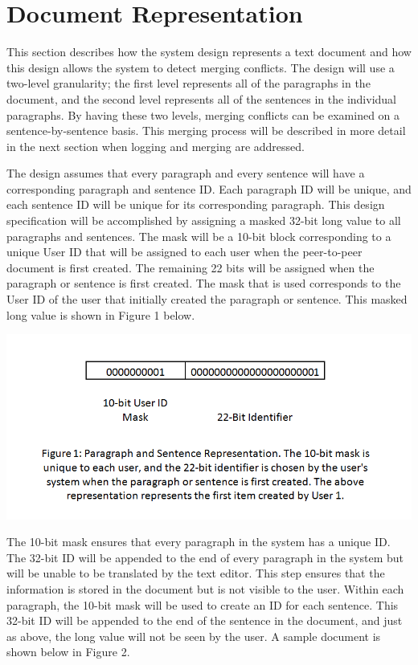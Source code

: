 \section{Document Representation}
This section describes how the system design represents a text document and how this design allows the system to detect merging conflicts. The design will use a two-level granularity; the first level represents all of the paragraphs in the document, and the second level represents all of the sentences in the individual paragraphs. By having these two levels, merging conflicts can be examined on a sentence-by-sentence basis. This merging process will be described in more detail in the next section when logging and merging are addressed.

The design assumes that every paragraph and every sentence will have a corresponding paragraph and sentence ID. Each paragraph ID will be unique, and each sentence ID will be unique for its corresponding paragraph. This design specification will be accomplished by assigning a masked 32-bit long value to all paragraphs and sentences. The mask will be a 10-bit block corresponding to a unique User ID that will be assigned to each user when the peer-to-peer document is first created. The remaining 22 bits will be assigned when the paragraph or sentence is first created. The mask that is used corresponds to the User ID of the user that initially created the paragraph or sentence.  This masked long value is shown in Figure 1 below.

\includegraphics[scale=0.55]{Figure1.png}

The 10-bit mask ensures that every paragraph in the system has a unique ID. The 32-bit ID will be appended to the end of every paragraph in the system but will be unable to be translated by the text editor. This step ensures that the information is stored in the document but is not visible to the user. Within each paragraph, the 10-bit mask will be used to create an ID for each sentence. This 32-bit ID will be appended to the end of the sentence in the document, and just as above, the long value will not be seen by the user. A sample document is shown below in Figure 2.

